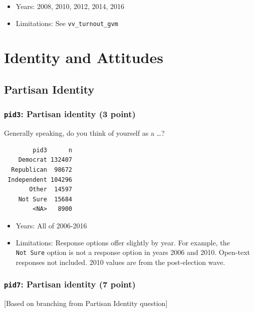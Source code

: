 \documentclass[10pt,article,oneside]{memoir}
\theoremstyle{definition}
\begin{document}
\begin{itemize}
\tightlist
\item
  Years: 2008, 2010, 2012, 2014, 2016
\item
  Limitations: See \texttt{vv\_turnout\_gvm}
\end{itemize}

\newpage

\section{Identity and Attitudes}\label{identity-and-attitudes}

\subsection{Partisan Identity}\label{partisan-identity}

\subsubsection{\texorpdfstring{\texttt{pid3}: Partisan identity (3
point)}{pid3: Partisan identity (3 point)}}\label{pid3-partisan-identity-3-point}

Generally speaking, do you think of yourself as a \ldots{}?

\begin{verbatim}
        pid3      n
    Democrat 132407
  Republican  98672
 Independent 104296
       Other  14597
    Not Sure  15684
        <NA>   8900
\end{verbatim}

\begin{itemize}
\tightlist
\item
  Years: All of 2006-2016
\item
  Limitations: Response options offer slightly by year. For example, the
  \texttt{Not\ Sure} option is not a response option in years 2006 and
  2010. Open-text responses not included. 2010 values are from the
  post-election wave.
\end{itemize}

\subsubsection{\texorpdfstring{\texttt{pid7}: Partisan identity (7
point)}{pid7: Partisan identity (7 point)}}\label{pid7-partisan-identity-7-point}

{[}Based on branching from Partisan Identity question{]}
\end{document}
